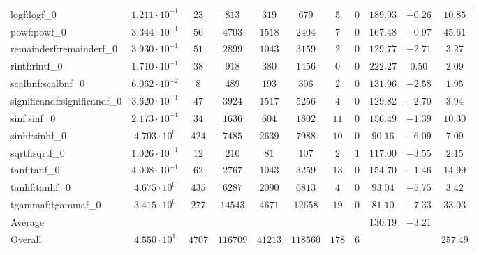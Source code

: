 \begin{tabular}{|l|c|c|c|c|c|c|c|c|c|c|}
logf:logf\_0                 & $ 1.211 \cdot 10^{-1} $ & $ 23     $ & $ 813    $ & $ 319   $ & $ 679    $ & $ 5   $ & $ 0 $ & $ 189.93      $ & $ -0.26   $ & $ 10.85   $ \\
powf:powf\_0                 & $ 3.344 \cdot 10^{-1} $ & $ 56     $ & $ 4703   $ & $ 1518  $ & $ 2404   $ & $ 7   $ & $ 0 $ & $ 167.48      $ & $ -0.97   $ & $ 45.61   $ \\
remainderf:remainderf\_0     & $ 3.930 \cdot 10^{-1} $ & $ 51     $ & $ 2899   $ & $ 1043  $ & $ 3159   $ & $ 2   $ & $ 0 $ & $ 129.77      $ & $ -2.71   $ & $ 3.27    $ \\
rintf:rintf\_0               & $ 1.710 \cdot 10^{-1} $ & $ 38     $ & $ 918    $ & $ 380   $ & $ 1456   $ & $ 0   $ & $ 0 $ & $ 222.27      $ & $ 0.50    $ & $ 2.09    $ \\
scalbnf:scalbnf\_0           & $ 6.062 \cdot 10^{-2} $ & $ 8      $ & $ 489    $ & $ 193   $ & $ 306    $ & $ 2   $ & $ 0 $ & $ 131.96      $ & $ -2.58   $ & $ 1.95    $ \\
significandf:significandf\_0 & $ 3.620 \cdot 10^{-1} $ & $ 47     $ & $ 3924   $ & $ 1517  $ & $ 5256   $ & $ 4   $ & $ 0 $ & $ 129.82      $ & $ -2.70   $ & $ 3.94    $ \\
sinf:sinf\_0                 & $ 2.173 \cdot 10^{-1} $ & $ 34     $ & $ 1636   $ & $ 604   $ & $ 1802   $ & $ 11  $ & $ 0 $ & $ 156.49      $ & $ -1.39   $ & $ 10.30   $ \\
sinhf:sinhf\_0               & $ 4.703 \cdot 10^{0}  $ & $ 424    $ & $ 7485   $ & $ 2639  $ & $ 7988   $ & $ 10  $ & $ 0 $ & $ 90.16       $ & $ -6.09   $ & $ 7.09    $ \\
sqrtf:sqrtf\_0               & $ 1.026 \cdot 10^{-1} $ & $ 12     $ & $ 210    $ & $ 81    $ & $ 107    $ & $ 2   $ & $ 1 $ & $ 117.00      $ & $ -3.55   $ & $ 2.15    $ \\
tanf:tanf\_0                 & $ 4.008 \cdot 10^{-1} $ & $ 62     $ & $ 2767   $ & $ 1043  $ & $ 3259   $ & $ 13  $ & $ 0 $ & $ 154.70      $ & $ -1.46   $ & $ 14.99   $ \\
tanhf:tanhf\_0               & $ 4.675 \cdot 10^{0}  $ & $ 435    $ & $ 6287   $ & $ 2090  $ & $ 6813   $ & $ 4   $ & $ 0 $ & $ 93.04       $ & $ -5.75   $ & $ 3.42    $ \\
tgammaf:tgammaf\_0           & $ 3.415 \cdot 10^{0}  $ & $ 277    $ & $ 14543  $ & $ 4671  $ & $ 12658  $ & $ 19  $ & $ 0 $ & $ 81.10       $ & $ -7.33   $ & $ 33.03   $ \\
\hline
Average                      & $                     $ & $        $ & $        $ & $       $ & $        $ & $     $ & $   $ & $ 130.19      $ & $ -3.21   $ & $         $ \\
\hline
Overall                      & $ 4.550 \cdot 10^{1}  $ & $ 4707   $ & $ 116709 $ & $ 41213 $ & $ 118560 $ & $ 178 $ & $ 6 $ & $             $ & $         $ & $ 257.49  $ \\
\hline
\end{tabular}
